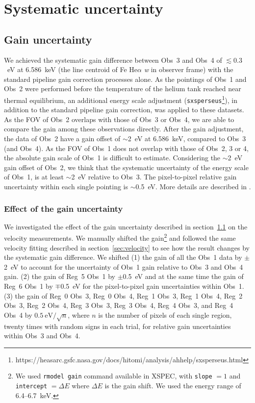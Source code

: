 \section{Systematic uncertainty}
\label{sec:systematic}

\subsection{Gain uncertainty}
\label{sec:gain}

We achieved the systematic gain difference between Obs~3 and Obs~4 of $\lesssim0.3$~eV at 6.586~keV (the line centroid of Fe He$\alpha$ {\it w} in observer frame) with the standard pipeline gain correction processes alone. As the pointings of Obs~1 and Obs~2 were performed before the temperature of the helium tank reached near thermal equilibrium, an additional energy scale adjustment (\verb+sxsperseus+\footnote{https://heasarc.gsfc.nasa.gov/docs/hitomi/analysis/ahhelp/sxsperseus.html}), in addition to the standard pipeline gain correction, was applied to these datasets. As the FOV of Obs~2 overlaps with those of Obs~3 or Obs~4, we are able to compare the gain among these observations directly. After the gain adjustment, the data of Obs~2 have a gain offset of $\sim$2~eV at 6.586~keV, compared to Obs~3 (and Obs~4). As the FOV of Obs~1 does not overlap with those of Obs~2, 3 or 4, the absolute gain scale of Obs~1 is difficult to estimate. Considering the $\sim$2~eV gain offset of Obs~2, we think that the systematic uncertainty of the energy scale of Obs~1, is at least $\sim$2~eV relative to Obs~3. The pixel-to-pixel relative gain uncertainty within each single pointing is $\sim$0.5~eV. More details are described in \citet[][]{eckart17}.

\subsubsection{Effect of the gain uncertainty}
\label{sec:effect}

We investigated the effect of the gain uncertainty described in section~\ref{sec:gain} on the velocity measurements. We manually shifted the gain\footnote{We used \texttt{rmodel gain} command available in XSPEC, with \texttt{slope} $=1$ and \texttt{intercept} $=\Delta E$ where $\Delta E$ is the gain shift. We used the energy range of 6.4--6.7~keV.} and followed the same velocity fitting described in section~\ref{sec:velocity} to see how the result changes by the systematic gain difference. We shifted (1) the gain of all the Obs~1 data by $\pm$2~eV to account for the uncertainty of Obs~1 gain relative to Obs~3 and Obs~4 gain. (2) the gain of Reg~5 Obs~1 by $\pm$0.5~eV and at the same time the gain of Reg~6 Obs~1 by $\mp$0.5~eV for the pixel-to-pixel gain uncertainties within Obs~1. (3) the gain of Reg~0 Obs~3, Reg~0 Obs~4, Reg~1 Obs~3, Reg~1 Obs~4, Reg~2 Obs~3, Reg~2 Obs~4, Reg~3 Obs~3, Reg~3 Obs~4, Reg~4 Obs~3, and Reg~4 Obs~4 by $0.5~\mathrm{eV}/\sqrt{n}$, where $n$ is the number of pixels of each single region, twenty times with random signs in each trial, for relative gain uncertainties within Obs~3 and Obs~4.

